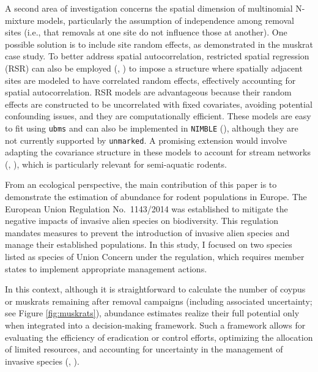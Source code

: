 \documentclass[
  11pt,
  a4paper,
]{article}
\begin{document}
A second area of investigation concerns the spatial dimension of multinomial N-mixture models, particularly the assumption of independence among removal sites (i.e., that removals at one site do not influence those at another). One possible solution is to include site random effects, as demonstrated in the muskrat case study. To better address spatial autocorrelation, restricted spatial regression (RSR) can also be employed (, ) to impose a structure where spatially adjacent sites are modeled to have correlated random effects, effectively accounting for spatial autocorrelation. RSR models are advantageous because their random effects are constructed to be uncorrelated with fixed covariates, avoiding potential confounding issues, and they are computationally efficient. These models are easy to fit using \texttt{ubms} and can also be implemented in \texttt{NIMBLE} (), although they are not currently supported by \texttt{unmarked}. A promising extension would involve adapting the covariance structure in these models to account for stream networks (, ), which is particularly relevant for semi-aquatic rodents.

From an ecological perspective, the main contribution of this paper is to demonstrate the estimation of abundance for rodent populations in Europe. The European Union Regulation No.~1143/2014 was established to mitigate the negative impacts of invasive alien species on biodiversity. This regulation mandates measures to prevent the introduction of invasive alien species and manage their established populations. In this study, I focused on two species listed as species of Union Concern under the regulation, which requires member states to implement appropriate management actions.

In this context, although it is straightforward to calculate the number of coypus or muskrats remaining after removal campaigns (including associated uncertainty; see Figure \ref{fig:muskrats}), abundance estimates realize their full potential only when integrated into a decision-making framework. Such a framework allows for evaluating the efficiency of eradication or control efforts, optimizing the allocation of limited resources, and accounting for uncertainty in the management of invasive species (, ).
\end{document}

